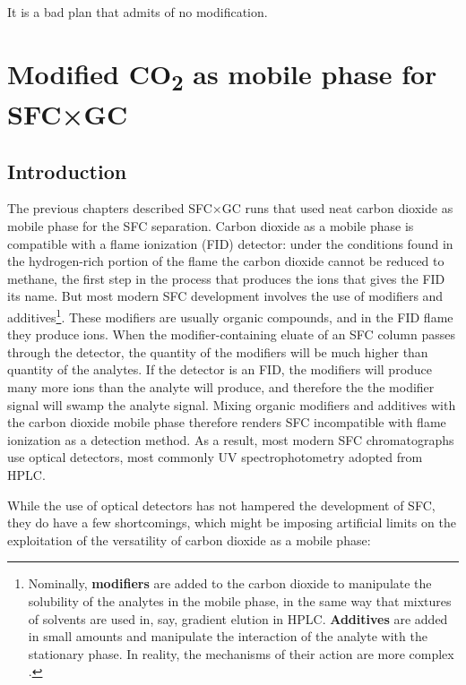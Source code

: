 
\begin{savequote}[\quotewidth]
It is a bad plan that admits of no modification.
\end{savequote}

\chapter{Modified CO\texorpdfstring{\textsubscript{2}}{\texttwoinferior} as mobile phase for SFC\texorpdfstring{×}{x}GC} %
\label{Chapter8}

\section{Introduction}

The previous chapters described SFC×GC runs that used neat carbon dioxide as
mobile phase for the SFC separation. Carbon dioxide as a mobile phase is
compatible with a flame ionization (FID) detector: under the conditions found in
the hydrogen-rich portion of the flame the carbon dioxide cannot be reduced to
methane, the first step in the process that produces the ions that gives the FID
its name. But most modern SFC development involves the use of modifiers and
additives\footnote{Nominally, \textbf{modifiers} are added to the carbon dioxide
to manipulate the solubility of the analytes in the mobile phase, in the same
way that mixtures of solvents are used in, say, gradient elution in HPLC.
\textbf{Additives} are added in small amounts and manipulate the interaction of
the analyte with the stationary phase. In reality, the mechanisms of their action
are more complex \autocite{Berger1991}.}. These modifiers are usually organic
compounds, and in the FID flame they produce ions. When the modifier-containing
eluate of an SFC column passes through the detector, the quantity of the
modifiers will be much higher than quantity of the analytes. If the detector is
an FID, the modifiers will produce many more ions than the analyte will produce,
and therefore the the modifier signal will swamp the analyte signal. Mixing
organic modifiers and additives with the carbon dioxide mobile phase therefore
renders SFC incompatible with flame ionization as a detection method. As a
result, most modern SFC chromatographs use optical detectors, most commonly UV
spectrophotometry adopted from HPLC.

While the use of optical detectors has not hampered the development of SFC,
they do have a few shortcomings, which might be imposing artificial limits on
the exploitation of the versatility of carbon dioxide as a mobile phase:

